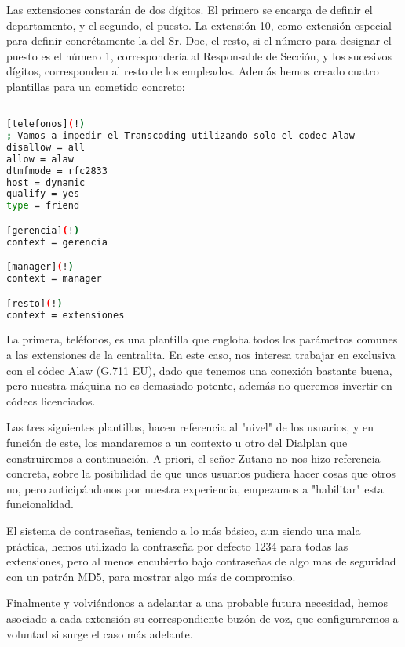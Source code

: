 
Las extensiones constarán de dos dígitos. El primero se encarga de definir el departamento, y el segundo, el puesto. La extensión 10, como extensión especial para definir concrétamente la del Sr. Doe, el resto, si el número para designar el puesto es el número 1, correspondería al Responsable de Sección, y los sucesivos dígitos, corresponden al resto de los empleados. Además hemos creado cuatro plantillas para un cometido concreto: 

\begin{lstlisting}[language=bash,title={/etc/asterisk/sip.conf}]

[telefonos](!)
; Vamos a impedir el Transcoding utilizando solo el codec Alaw
disallow = all
allow = alaw
dtmfmode = rfc2833
host = dynamic
qualify = yes
type = friend

[gerencia](!)
context = gerencia

[manager](!)
context = manager

[resto](!)
context = extensiones

\end{lstlisting}

La primera, teléfonos, es una plantilla que engloba todos los parámetros comunes a las extensiones de la centralita. En este caso, nos interesa trabajar en exclusiva con el códec Alaw (G.711 EU), dado que tenemos una conexión bastante buena, pero nuestra máquina no es demasiado potente, además no queremos invertir en códecs licenciados.

Las tres siguientes plantillas, hacen referencia al "nivel" de los usuarios, y en función de este, los mandaremos a un contexto u otro del Dialplan que construiremos a continuación. A priori, el señor Zutano no nos hizo referencia concreta, sobre la posibilidad de que unos usuarios pudiera hacer cosas que otros no, pero anticipándonos por nuestra experiencia, empezamos a "habilitar" esta funcionalidad.

El sistema de contraseñas, teniendo a lo más básico, aun siendo una mala práctica, hemos utilizado la contraseña por defecto 1234 para todas las extensiones, pero al menos encubierto bajo contraseñas de algo mas de seguridad con un patrón MD5, para mostrar algo más de compromiso.

Finalmente y volviéndonos a adelantar a una probable futura necesidad, hemos asociado a cada extensión su correspondiente buzón de voz, que configuraremos a voluntad si surge el caso más adelante.

